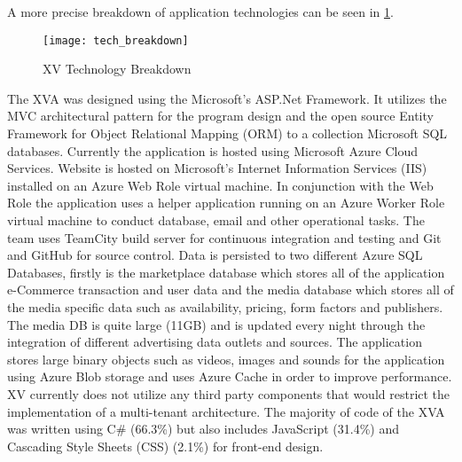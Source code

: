  
A more precise breakdown of application technologies can be seen in \ref{fig:tech_breakdown}.

\begin{figure}
\centering
\texttt{[image: tech\_breakdown]}
\caption{XV Technology Breakdown}
\label{fig:tech_breakdown}
\end{figure}

The XVA was designed using the Microsoft's ASP.Net Framework. It utilizes the MVC architectural pattern for the program design and the open source Entity Framework for Object Relational Mapping (ORM) to a collection Microsoft SQL databases. Currently the application is hosted using Microsoft Azure Cloud Services. Website is hosted on Microsoft's Internet Information Services (IIS) installed on an Azure Web Role virtual machine. In conjunction with the Web Role the application uses a helper application running on an Azure Worker Role virtual machine to conduct database, email and other operational tasks. The team uses TeamCity build server for continuous integration and testing and Git and GitHub for source control. Data is persisted to two different Azure SQL Databases, firstly is the marketplace database which stores all of the application e-Commerce transaction and user data and the media database which stores all of the media specific data such as availability, pricing, form factors and publishers. The media DB is quite large (11GB) and is updated every night through the integration of different advertising data outlets and sources. The application stores large binary objects such as videos, images and sounds for the application using Azure Blob storage and uses Azure Cache in order to improve performance. XV currently does not utilize any third party components that would restrict the implementation of a multi-tenant architecture. The majority of code of the XVA was written using C\# (66.3\%) but also includes JavaScript (31.4\%) and Cascading Style Sheets (CSS) (2.1\%) for front-end design.



